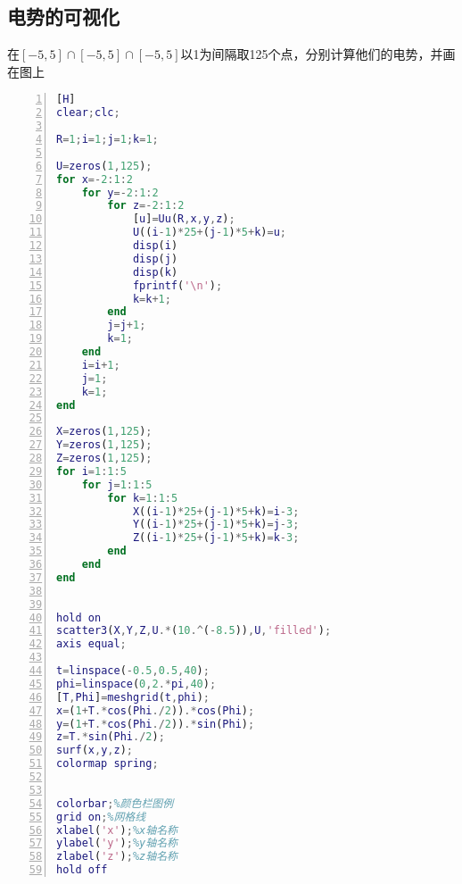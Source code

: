 \subsection{电势的可视化}
在$\left[-5,5\right]\cap\left[-5,5\right]\cap\left[-5,5\right]$以1为间隔取125个点，分别计算他们的电势，并画在图上
\begin{lstlisting}[language={Matlab},
  numbers=left,
  numberstyle=\tiny\menlo,
  basicstyle=\small\menlo][H]
clear;clc;

R=1;i=1;j=1;k=1;

U=zeros(1,125);
for x=-2:1:2
    for y=-2:1:2
        for z=-2:1:2
            [u]=Uu(R,x,y,z);
            U((i-1)*25+(j-1)*5+k)=u;
            disp(i)
            disp(j)
            disp(k)
            fprintf('\n');
            k=k+1;
        end
        j=j+1;
        k=1;
    end
    i=i+1;
    j=1;
    k=1;
end

X=zeros(1,125);
Y=zeros(1,125);
Z=zeros(1,125);
for i=1:1:5
    for j=1:1:5
        for k=1:1:5
            X((i-1)*25+(j-1)*5+k)=i-3;
            Y((i-1)*25+(j-1)*5+k)=j-3;
            Z((i-1)*25+(j-1)*5+k)=k-3;
        end
    end
end


hold on
scatter3(X,Y,Z,U.*(10.^(-8.5)),U,'filled');
axis equal;

t=linspace(-0.5,0.5,40);
phi=linspace(0,2.*pi,40);
[T,Phi]=meshgrid(t,phi);
x=(1+T.*cos(Phi./2)).*cos(Phi);
y=(1+T.*cos(Phi./2)).*sin(Phi);
z=T.*sin(Phi./2);
surf(x,y,z);
colormap spring;


colorbar;%颜色栏图例
grid on;%网格线
xlabel('x');%x轴名称
ylabel('y');%y轴名称
zlabel('z');%z轴名称
hold off
\end{lstlisting}